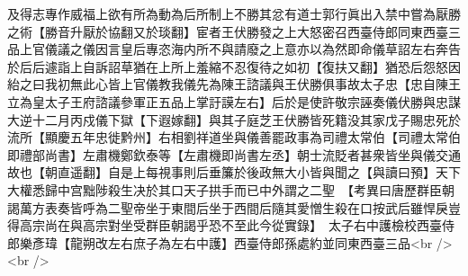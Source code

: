 及得志專作威福上欲有所為動為后所制上不勝其忿有道士郭行眞出入禁中嘗為厭勝之術【勝音升厭於協翻又於琰翻】宦者王伏勝發之上大怒密召西臺侍郎同東西臺三品上官儀議之儀因言皇后專恣海内所不與請廢之上意亦以為然即命儀草詔左右奔告於后后遽詣上自訴詔草猶在上所上羞縮不忍復待之如初【復扶又翻】猶恐后怨怒因紿之曰我初無此心皆上官儀教我儀先為陳王諮議與王伏勝俱事故太子忠【忠自陳王立為皇太子王府諮議參軍正五品上掌訏謨左右】后於是使許敬宗誣奏儀伏勝與忠謀大逆十二月丙戍儀下獄【下遐嫁翻】與其子庭芝王伏勝皆死籍没其家戊子賜忠死於流所【顯慶五年忠徙黔州】右相劉祥道坐與儀善罷政事為司禮太常伯【司禮太常伯即禮部尚書】左肅機鄭欽泰等【左肅機即尚書左丞】朝士流貶者甚衆皆坐與儀交通故也【朝直遥翻】自是上每視事則后垂簾於後政無大小皆與聞之【與讀曰預】天下大權悉歸中宫黜陟殺生决於其口天子拱手而已中外謂之二聖　【考異曰唐歷群臣朝謁萬方表奏皆呼為二聖帝坐于東間后坐于西間后隨其愛憎生殺在口按武后雖悍戾豈得高宗尚在與高宗對坐受群臣朝謁乎恐不至此今從實錄】　太子右中護檢校西臺侍郎樂彥瑋【龍朔改左右庶子為左右中護】西臺侍郎孫處約並同東西臺三品<br />
<br />
